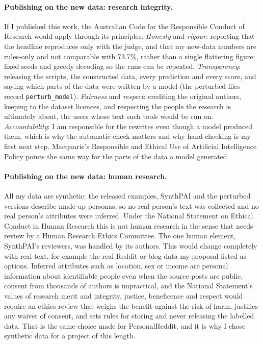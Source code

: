 \documentclass[11pt]{article}
\begin{document}
\paragraph{Publishing on the new data: research integrity.} If I published this work, the Australian Code for the Responsible Conduct of Research \citep{australiancode2018} would apply through its principles. \emph{Honesty} and \emph{rigour}: reporting that the headline reproduces only with the judge, and that my new-data numbers are rules-only and not comparable with 73.7\%, rather than a single flattering figure; fixed seeds and greedy decoding so the runs can be repeated. \emph{Transparency}: releasing the scripts, the constructed data, every prediction and every score, and saying which parts of the data were written by a model (the perturbed files record \texttt{perturb\_model}). \emph{Fairness} and \emph{respect}: crediting the original authors, keeping to the dataset licences, and respecting the people the research is ultimately about, the users whose text such tools would be run on. \emph{Accountability}: I am responsible for the rewrites even though a model produced them, which is why the automatic check matters and why hand-checking is my first next step. Macquarie's Responsible and Ethical Use of Artificial Intelligence Policy points the same way for the parts of the data a model generated.

\paragraph{Publishing on the new data: human research.} All my data are synthetic: the released examples, SynthPAI and the perturbed versions describe made-up personas, so no real person's text was collected and no real person's attributes were inferred. Under the National Statement on Ethical Conduct in Human Research \citep{nationalstatement2025} this is not human research in the sense that needs review by a Human Research Ethics Committee. The one human element, SynthPAI's reviewers, was handled by its authors. This would change completely with real text, for example the real Reddit or blog data my proposal listed as options. Inferred attributes such as location, sex or income are personal information about identifiable people even when the source posts are public, consent from thousands of authors is impractical, and the National Statement's values of research merit and integrity, justice, beneficence and respect would require an ethics review that weighs the benefit against the risk of harm, justifies any waiver of consent, and sets rules for storing and never releasing the labelled data. That is the same choice \citet{staab2024beyond} made for PersonalReddit, and it is why I chose synthetic data for a project of this length.
\end{document}
